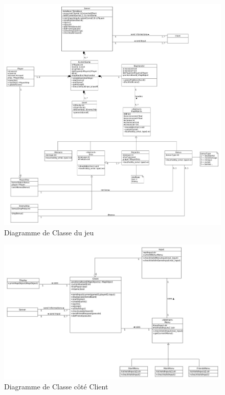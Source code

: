\documentclass[a4paper,12pt]{article}
\begin{document}
\begin{figure}[hbtp]
\centering
\includegraphics[scale=0.3]{images/newGameClassDiagram.jpg}
\caption{Diagramme de Classe du jeu}
\end{figure}

\begin{figure}[hbtp]
\centering
\includegraphics[scale=0.3]{images/newClientClassDiagram.jpg}
\caption{Diagramme de Classe côté Client}
\end{figure}

\newpage
\end{document}
